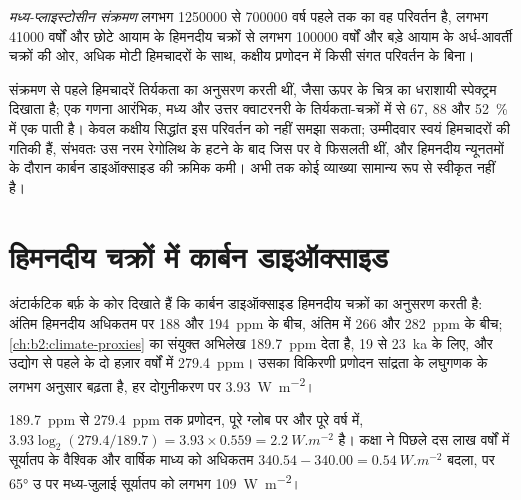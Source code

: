 \begin{definition}[मध्य-प्लाइस्टोसीन संक्रमण]\label{def:b2:orbital-forcing:mpt}
\emph{मध्य-प्लाइस्टोसीन संक्रमण} लगभग
\num{1250000} से \num{700000} वर्ष पहले तक का वह परिवर्तन है, लगभग \num{41000} वर्षों और छोटे
आयाम के हिमनदीय चक्रों से लगभग \num{100000} वर्षों और बड़े आयाम के अर्ध-आवर्ती चक्रों की ओर, अधिक मोटी
हिमचादरों के साथ, कक्षीय प्रणोदन में किसी संगत परिवर्तन के बिना।
\end{definition}

संक्रमण से पहले हिमचादरें तिर्यकता का अनुसरण करती थीं, जैसा ऊपर के चित्र का धराशायी
स्पेक्ट्रम दिखाता है; एक गणना आरंभिक, मध्य और उत्तर क्वाटरनरी के तिर्यकता-चक्रों में से 67, 88 और \qty{52}{\percent}
में एक  पाती है। केवल कक्षीय सिद्धांत इस परिवर्तन को नहीं समझा सकता; उम्मीदवार
स्वयं हिमचादरों की गतिकी हैं, संभवतः उस नरम रेगोलिथ के हटने के बाद जिस पर वे फिसलती थीं,
और हिमनदीय न्यूनतमों के दौरान कार्बन डाइऑक्साइड की क्रमिक कमी। अभी तक कोई व्याख्या
सामान्य रूप से स्वीकृत नहीं है।

\section{हिमनदीय चक्रों में कार्बन डाइऑक्साइड}\label{sec:b2:orbital-forcing:co2}

अंटार्कटिक बर्फ़ के कोर दिखाते हैं कि कार्बन डाइऑक्साइड हिमनदीय चक्रों का अनुसरण करती है: अंतिम हिमनदीय अधिकतम पर 188 और
\qty{194}{ppm} के बीच, अंतिम  में 266 और \qty{282}{ppm} के बीच;
\cref{ch:b2:climate-proxies} का संयुक्त अभिलेख \qty{189.7}{ppm} देता है, 19 से \qty{23}{ka} के लिए,
और उद्योग से पहले के दो हज़ार वर्षों में \qty{279.4}{ppm}। उसका विकिरणी प्रणोदन
सांद्रता के लघुगणक के लगभग अनुसार बढ़ता है, हर दोगुनीकरण पर \qty{3.93}{W.m^{-2}}।

\begin{example}[कक्षा बनाम कार्बन डाइऑक्साइड]\label{ex:b2:orbital-forcing:co2}
\qty{189.7}{ppm} से \qty{279.4}{ppm} तक प्रणोदन, पूरे ग्लोब पर और पूरे वर्ष में, $3.93\log_2(279.4/189.7) = 3.93 \times
0.559 = \qty{2.2}{W.m^{-2}}$ है। कक्षा ने पिछले
दस लाख वर्षों में सूर्यातप के वैश्विक और वार्षिक माध्य को अधिकतम $340.54 - 340.00 =
\qty{0.54}{W.m^{-2}}$ बदला, पर \ang{65} उ पर मध्य-जुलाई सूर्यातप को लगभग \qty{109}{W.m^{-2}}।
\end{example}

